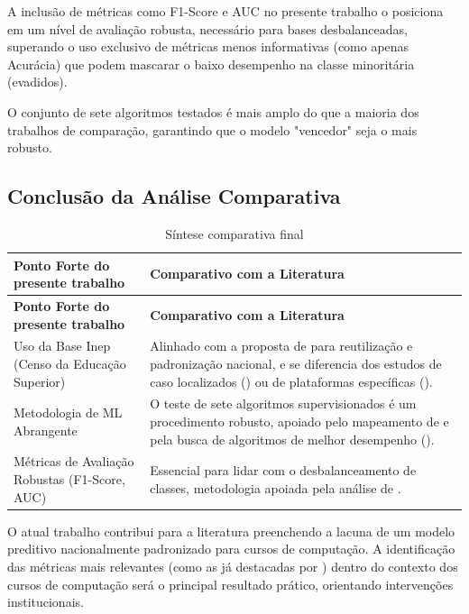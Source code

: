 \documentclass[english, spanish, brazilian]{RBIEarticle} %
\begin{document}
A inclusão de métricas como F1-Score e AUC no presente trabalho o posiciona em um nível de avaliação robusta, necessário para bases desbalanceadas, superando o uso exclusivo de métricas menos informativas (como apenas Acurácia) que podem mascarar o baixo desempenho na classe minoritária (evadidos).

O conjunto de sete algoritmos testados é mais amplo do que a maioria dos trabalhos de comparação, garantindo que o modelo "vencedor" seja o mais robusto.


\subsection{Conclusão da Análise Comparativa}

\begin{longtable}{|p{7cm}|p{8cm}|}
    \caption{Síntese comparativa final}\\
    \toprule
    \textbf{Ponto Forte do presente trabalho} & \textbf{Comparativo com a Literatura} \\
    \midrule
    \endfirsthead
    \toprule
    \textbf{Ponto Forte do presente trabalho} & \textbf{Comparativo com a Literatura} \\
    \midrule
    \endhead
    Uso da Base Inep (Censo da Educação Superior) & Alinhado com a proposta de \cite{jesus2024dissertacao} para reutilização e padronização nacional, e se diferencia dos estudos de caso localizados (\cite{ramos2018comparativo}) ou de plataformas específicas (\cite{tamada2025predicting}). \\ \hline

    Metodologia de ML Abrangente & O teste de sete algoritmos supervisionados é um procedimento robusto, apoiado pelo mapeamento de \cite{jesus2024mapeamento} e pela busca de algoritmos de melhor desempenho (\cite{andradegiron2023predicting}). \\ \hline
    
    Métricas de Avaliação Robustas (F1-Score, AUC) & Essencial para lidar com o desbalanceamento de classes, metodologia apoiada pela análise de \cite{neves2024ficare}. \\
    \bottomrule
\end{longtable}

O atual trabalho contribui para a literatura preenchendo a lacuna de um modelo preditivo nacionalmente padronizado para cursos de computação. A identificação das métricas mais relevantes (como as já destacadas por \cite{jesus2024mapeamento}) dentro do contexto dos cursos de computação será o principal resultado prático, orientando intervenções institucionais.
\end{document}
